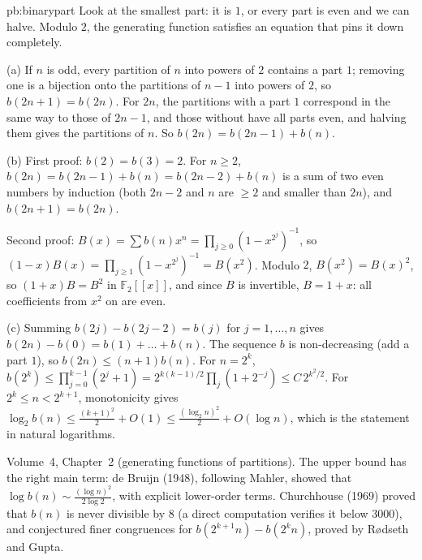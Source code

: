 \begin{solution}{pb:binarypart}
\idea Look at the smallest part: it is $1$, or every part is even and we can halve. Modulo $2$, the generating function satisfies an
equation that pins it down completely.

\writeup (a) If $n$ is odd, every partition of $n$ into powers of $2$ contains a part $1$; removing one is a bijection onto the
partitions of $n-1$ into powers of $2$, so $b(2n+1)=b(2n)$. For $2n$, the partitions with a part $1$ correspond in the same way to
those of $2n-1$, and those without have all parts even, and halving them gives the partitions of $n$. So $b(2n)=b(2n-1)+b(n)$.

(b) First proof: $b(2)=b(3)=2$. For $n\ge2$, $b(2n)=b(2n-1)+b(n)=b(2n-2)+b(n)$ is a sum of two even numbers by induction (both
$2n-2$ and $n$ are $\ge2$ and smaller than $2n$), and $b(2n+1)=b(2n)$.

Second proof: $B(x)=\sum b(n)x^n=\prod_{j\ge0}(1-x^{2^j})^{-1}$, so $(1-x)B(x)=\prod_{j\ge1}(1-x^{2^j})^{-1}=B(x^2)$. Modulo $2$, $B(x^2)=B(x)^2$, so
$(1+x)B=B^2$ in $\mathbb F_2[[x]]$, and since $B$ is invertible, $B=1+x$: all coefficients from $x^2$ on are even.

(c) Summing $b(2j)-b(2j-2)=b(j)$ for $j=1,\dots,n$ gives $b(2n)-b(0)=b(1)+\dots+b(n)$. The sequence $b$ is non-decreasing (add a part
$1$), so $b(2n)\le(n+1)b(n)$. For $n=2^k$, $b(2^k)\le\prod_{j=0}^{k-1}(2^j+1)=2^{k(k-1)/2}\prod_j(1+2^{-j})\le C\,2^{k^2/2}$. For
$2^k\le n<2^{k+1}$, monotonicity gives $\log_2b(n)\le\frac{(k+1)^2}2+O(1)\le\frac{(\log_2n)^2}2+O(\log n)$, which is the statement in
natural logarithms.

\tools Volume~4, Chapter~2 (generating functions of partitions).
\leads The upper bound has the right main term: de Bruijn (1948), following Mahler, showed that $\log b(n)\sim\frac{(\log n)^2}{2\log2}$,
with explicit lower-order terms. Churchhouse (1969) proved that $b(n)$ is never divisible by $8$ (a direct computation verifies it below $3000$), and conjectured finer congruences
for $b(2^{k+1}n)-b(2^kn)$, proved by Rødseth and Gupta.
\end{solution}

